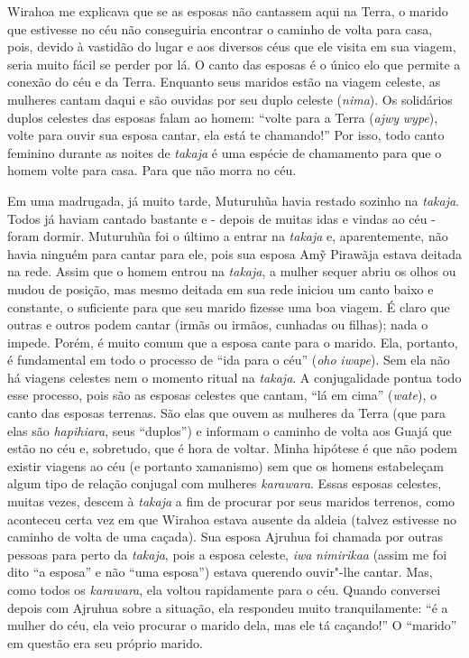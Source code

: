 Wirahoa me explicava que se as esposas não cantassem aqui na Terra, o
marido que estivesse no céu não conseguiria encontrar o caminho de volta
para casa, pois, devido à vastidão do lugar e aos diversos céus que ele
visita em sua viagem, seria muito fácil se perder por lá. O canto das
esposas é o único elo que permite a conexão do céu e da Terra. Enquanto
seus maridos estão na viagem celeste, as mulheres cantam daqui e são
ouvidas por seu duplo celeste (\emph{nima}). Os solidários duplos
celestes das esposas falam ao homem: ``volte para a Terra (\emph{ajwy}
\emph{wype}), volte para ouvir sua esposa cantar, ela está te chamando!''
Por isso, todo canto feminino durante as noites de \emph{takaja} é uma
espécie de chamamento para que o homem volte para casa. Para que não
morra no céu.

Em uma madrugada, já muito tarde, Muturuhũa havia restado sozinho na
\emph{takaja}. Todos já haviam cantado bastante e - depois de muitas
idas e vindas ao céu - foram dormir. Muturuhũa foi o último a entrar na
\emph{takaja} e, aparentemente, não havia ninguém para cantar para ele,
pois sua esposa Amỹ Pirawãja estava deitada na rede. Assim que o homem
entrou na \emph{takaja}, a mulher sequer abriu os olhos ou mudou de
posição, mas mesmo deitada em sua rede iniciou um canto baixo e
constante, o suficiente para que seu marido fizesse uma boa viagem. É
claro que outras e outros podem cantar (irmãs ou irmãos, cunhadas ou
filhas); nada o impede. Porém, é muito comum que a esposa cante para o
marido. Ela, portanto, é fundamental em todo o processo de ``ida para o
céu'' (\emph{oho} \emph{iwape}). Sem ela não há viagens celestes nem o
momento ritual na \emph{takaja}. A conjugalidade pontua todo esse
processo, pois são as esposas celestes que cantam, ``lá em cima''
(\emph{wate}), o canto das esposas terrenas. São elas que ouvem as
mulheres da Terra (que para elas são \emph{hapihiara}, seus ``duplos'') e
informam o caminho de volta aos Guajá que estão no céu e, sobretudo, que
é hora de voltar. Minha hipótese é que não podem existir viagens ao céu
(e portanto xamanismo) sem que os homens estabeleçam algum tipo de
relação conjugal com mulheres \emph{karawara}. Essas esposas celestes,
muitas vezes, descem à \emph{takaja} a fim de procurar por seus maridos
terrenos, como aconteceu certa vez em que Wirahoa estava ausente da
aldeia (talvez estivesse no caminho de volta de uma caçada). Sua esposa
Ajruhua foi chamada por outras pessoas para perto da \emph{takaja}, pois
a esposa celeste, \emph{iwa} \emph{nimirikaa} (assim me foi dito ``a
esposa'' e não ``uma esposa'') estava querendo ouvir"-lhe cantar. Mas, como
todos os \emph{karawara}, ela voltou rapidamente para o céu. Quando
conversei depois com Ajruhua sobre a situação, ela respondeu muito
tranquilamente: ``é a mulher do céu, ela veio procurar o marido dela, mas
ele tá caçando!'' O ``marido'' em questão era seu próprio marido.

